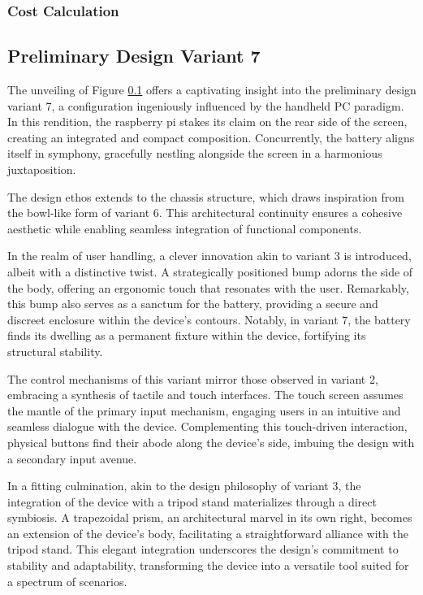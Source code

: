 \subsubsection{Cost Calculation}


\subsection{Preliminary Design Variant 7}

The unveiling of Figure \ref{} offers a captivating insight into the preliminary design variant 7, a configuration ingeniously influenced by the handheld PC paradigm. In this rendition, the raspberry pi stakes its claim on the rear side of the screen, creating an integrated and compact composition. Concurrently, the battery aligns itself in symphony, gracefully nestling alongside the screen in a harmonious juxtaposition.

The design ethos extends to the chassis structure, which draws inspiration from the bowl-like form of variant 6. This architectural continuity ensures a cohesive aesthetic while enabling seamless integration of functional components.

In the realm of user handling, a clever innovation akin to variant 3 is introduced, albeit with a distinctive twist. A strategically positioned bump adorns the side of the body, offering an ergonomic touch that resonates with the user. Remarkably, this bump also serves as a sanctum for the battery, providing a secure and discreet enclosure within the device's contours. Notably, in variant 7, the battery finds its dwelling as a permanent fixture within the device, fortifying its structural stability.

The control mechanisms of this variant mirror those observed in variant 2, embracing a synthesis of tactile and touch interfaces. The touch screen assumes the mantle of the primary input mechanism, engaging users in an intuitive and seamless dialogue with the device. Complementing this touch-driven interaction, physical buttons find their abode along the device's side, imbuing the design with a secondary input avenue.

In a fitting culmination, akin to the design philosophy of variant 3, the integration of the device with a tripod stand materializes through a direct symbiosis. A trapezoidal prism, an architectural marvel in its own right, becomes an extension of the device's body, facilitating a straightforward alliance with the tripod stand. This elegant integration underscores the design's commitment to stability and adaptability, transforming the device into a versatile tool suited for a spectrum of scenarios.


